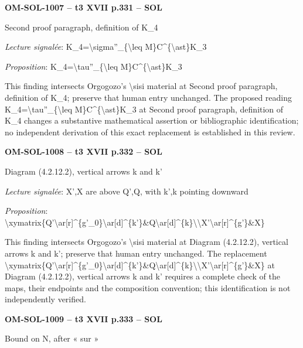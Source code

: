 \par\noindent\textbf{OM-SOL-1007 -- t3 XVII p.331 -- SOL}\par
Second proof paragraph, definition of K\_4\par
\emph{Lecture signalée}: K\_4=\allowbreak \textbackslash{}sigma''\_\{\textbackslash{}leq M\}C\textasciicircum{}\{\textbackslash{}ast\}K\_3\par
\emph{Proposition}: K\_4=\allowbreak \textbackslash{}tau''\_\{\textbackslash{}leq M\}C\textasciicircum{}\{\textbackslash{}ast\}K\_3\par
This finding intersects Orgogozo's \textbackslash{}sisi material at Second proof paragraph, definition of K\_4; preserve that human entry unchanged. The proposed reading K\_4=\allowbreak \textbackslash{}tau''\_\{\textbackslash{}leq M\}C\textasciicircum{}\{\textbackslash{}ast\}K\_3 at Second proof paragraph, definition of K\_4 changes a substantive mathematical assertion or bibliographic identification; no independent derivation of this exact replacement is established in this review.\par
\par\noindent\textbf{OM-SOL-1008 -- t3 XVII p.332 -- SOL}\par
Diagram (4.2.12.2), vertical arrows k and k'\par
\emph{Lecture signalée}: X',X are above Q',Q, with k',k pointing downward\par
\emph{Proposition}: \textbackslash{}xymatrix\{Q'\textbackslash{}ar[r]\textasciicircum{}\{g'\_0\}\textbackslash{}ar[d]\textasciicircum{}\{k'\}\&Q\textbackslash{}ar[d]\textasciicircum{}\{k\}\textbackslash{}\textbackslash{}X'\textbackslash{}ar[r]\textasciicircum{}\{g'\}\&X\}\par
This finding intersects Orgogozo's \textbackslash{}sisi material at Diagram (4.2.12.2), vertical arrows k and k'; preserve that human entry unchanged. The replacement \textbackslash{}xymatrix\{Q'\textbackslash{}ar[r]\textasciicircum{}\{g'\_0\}\textbackslash{}ar[d]\textasciicircum{}\{k'\}\&Q\textbackslash{}ar[d]\textasciicircum{}\{k\}\textbackslash{}\textbackslash{}X'\textbackslash{}ar[r]\textasciicircum{}\{g'\}\&X\} at Diagram (4.2.12.2), vertical arrows k and k' requires a complete check of the maps, their endpoints and the composition convention; this identification is not independently verified.\par
\par\noindent\textbf{OM-SOL-1009 -- t3 XVII p.333 -- SOL}\par
Bound on N, after « sur »\par
